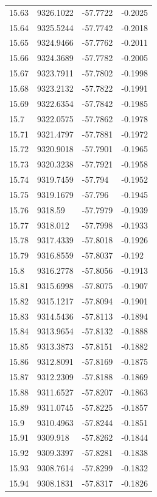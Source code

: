 \begin{table}[H]
\begin{tabular}{llll}
15.63 & 9326.1022 & -57.7722 & -0.2025 \\
15.64 & 9325.5244 & -57.7742 & -0.2018 \\
15.65 & 9324.9466 & -57.7762 & -0.2011 \\
15.66 & 9324.3689 & -57.7782 & -0.2005 \\
15.67 & 9323.7911 & -57.7802 & -0.1998 \\
15.68 & 9323.2132 & -57.7822 & -0.1991 \\
15.69 & 9322.6354 & -57.7842 & -0.1985 \\
15.7 & 9322.0575 & -57.7862 & -0.1978 \\
15.71 & 9321.4797 & -57.7881 & -0.1972 \\
15.72 & 9320.9018 & -57.7901 & -0.1965 \\
15.73 & 9320.3238 & -57.7921 & -0.1958 \\
15.74 & 9319.7459 & -57.794 & -0.1952 \\
15.75 & 9319.1679 & -57.796 & -0.1945 \\
15.76 & 9318.59 & -57.7979 & -0.1939 \\
15.77 & 9318.012 & -57.7998 & -0.1933 \\
15.78 & 9317.4339 & -57.8018 & -0.1926 \\
15.79 & 9316.8559 & -57.8037 & -0.192 \\
15.8 & 9316.2778 & -57.8056 & -0.1913 \\
15.81 & 9315.6998 & -57.8075 & -0.1907 \\
15.82 & 9315.1217 & -57.8094 & -0.1901 \\
15.83 & 9314.5436 & -57.8113 & -0.1894 \\
15.84 & 9313.9654 & -57.8132 & -0.1888 \\
15.85 & 9313.3873 & -57.8151 & -0.1882 \\
15.86 & 9312.8091 & -57.8169 & -0.1875 \\
15.87 & 9312.2309 & -57.8188 & -0.1869 \\
15.88 & 9311.6527 & -57.8207 & -0.1863 \\
15.89 & 9311.0745 & -57.8225 & -0.1857 \\
15.9 & 9310.4963 & -57.8244 & -0.1851 \\
15.91 & 9309.918 & -57.8262 & -0.1844 \\
15.92 & 9309.3397 & -57.8281 & -0.1838 \\
15.93 & 9308.7614 & -57.8299 & -0.1832 \\
15.94 & 9308.1831 & -57.8317 & -0.1826 \\

\end{tabular}
\end{table}
